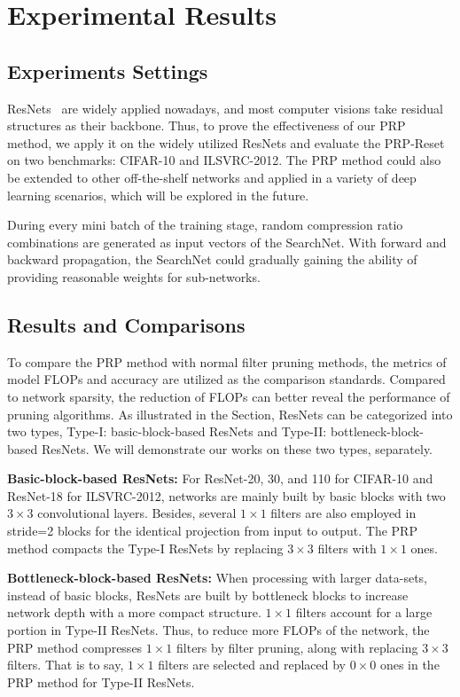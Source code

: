 \documentclass[journal,article,submit,pdftex,moreauthors]{Definitions/mdpi}
\begin{document}
\section{Experimental Results}\label{sec: experiment}

\subsection{Experiments Settings}
ResNets~\cite{M19} are widely applied nowadays, and most computer visions take residual structures as their backbone. Thus, to prove the effectiveness of our PRP method, we apply it on the widely utilized ResNets and evaluate the PRP-Reset on two benchmarks: CIFAR-10 and ILSVRC-2012. The PRP method could also be extended to other off-the-shelf networks and applied in a variety of deep learning scenarios, which will be explored in the future.


During every mini batch of the training stage, random compression ratio combinations are generated as input vectors of the SearchNet. With forward and backward propagation, the SearchNet could gradually gaining the ability of providing reasonable weights for sub-networks.

\subsection{Results and Comparisons}

To compare the PRP method with normal filter pruning methods, the metrics of model FLOPs and accuracy are utilized as the comparison standards. Compared to network sparsity, the reduction of FLOPs can better reveal the performance of pruning algorithms. As illustrated in the Section, ResNets can be categorized into two types, Type-I: basic-block-based ResNets and Type-II: bottleneck-block-based ResNets. We will demonstrate our works on these two types, separately.

\textbf{Basic-block-based ResNets:} For ResNet-20, 30, and 110 for CIFAR-10 and ResNet-18 for ILSVRC-2012, networks are mainly built by basic blocks with two $3\times 3$ convolutional layers. Besides, several $1\times 1$ filters are also employed in stride=2 blocks for the identical projection from input to output. The PRP method compacts the Type-I ResNets by replacing $3\times 3$ filters with $1\times 1$ ones.

\textbf{Bottleneck-block-based ResNets:} When processing with larger data-sets, instead of basic blocks, ResNets are built by bottleneck blocks to increase network depth with a more compact structure. $1\times 1$ filters account for a large portion in Type-II ResNets. Thus, to reduce more FLOPs of the network, the PRP method compresses $1\times 1$ filters by filter pruning, along with replacing $3\times 3$ filters. That is to say, $1\times 1$ filters are selected and replaced by $0\times 0$ ones in the PRP method for Type-II ResNets. 
\end{document}
